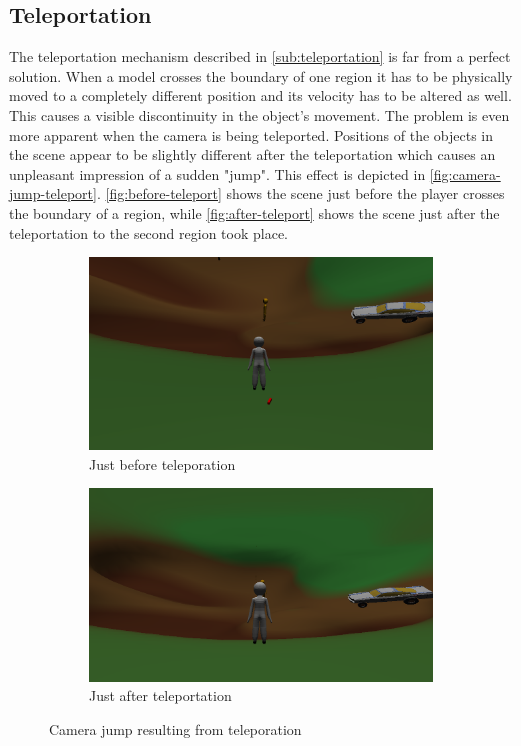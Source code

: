 \subsection{Teleportation}
The teleportation mechanism described in \autoref{sub:teleportation} is far from a perfect solution.
When a model crosses the boundary of one region it has to be physically moved to a completely different position and its velocity has to be altered as well.
This causes a visible discontinuity in the object's movement.
The problem is even more apparent when the camera is being teleported.
Positions of the objects in the scene appear to be slightly different after the teleportation which causes an unpleasant impression of a sudden "jump".
This effect is depicted in \autoref{fig:camera-jump-teleport}.
\autoref{fig:before-teleport} shows the scene just before the player crosses the boundary of a region, while \autoref{fig:after-teleport} shows the scene just after the teleportation to the second region took place.
\begin{figure}[h]
    \centering
    \begin{subfigure}[b]{0.475\textwidth}
        \centering
        \includegraphics[width=\textwidth]{chapters/problems/resources/just-before.png}
        \caption[]%
        {{\small Just before teleporation}}
        \label{fig:before-teleport}
    \end{subfigure}
    \hfill
    \begin{subfigure}[b]{0.475\textwidth}
        \centering
        \includegraphics[width=\textwidth]{chapters/problems/resources/just-after.png}
        \caption[]%
        {{\small Just after teleportation}}
        \label{fig:after-teleport}
    \end{subfigure}
    \caption[]
    {\small Camera jump resulting from teleporation}
    \label{fig:camera-jump-teleport}
\end{figure}